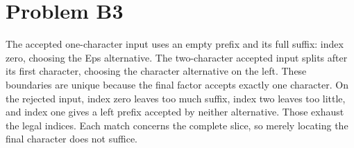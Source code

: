 \documentclass[11pt]{article}
\begin{document}
\section*{Problem B3}\label{ans:B3}
\begin{answer}
The accepted one-character input uses an empty prefix and its full suffix:
index zero, choosing the Eps alternative. The two-character accepted input
splits after its first character, choosing the character alternative on the
left. These boundaries are unique because the final factor accepts exactly
one character. On the rejected input, index zero leaves too much suffix,
index two leaves too little, and index one gives a left prefix accepted by
neither alternative. Those exhaust the legal indices. Each match concerns
the complete slice, so merely locating the final character does not suffice.
\end{answer}
\end{document}
